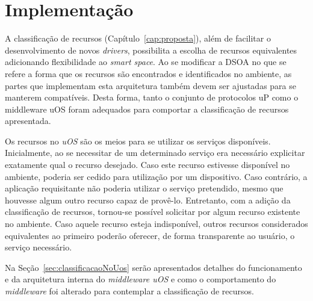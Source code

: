 \chapter{Implementação}

A classificação de recursos (Capítulo~\ref{cap:proposta}), além de facilitar o desenvolvimento de novos \emph{drivers}, possibilita a escolha de recursos equivalentes adicionando flexibilidade ao \emph{smart space}. Ao se modificar a DSOA no que se refere a forma que os recursos são encontrados e identificados no ambiente, as partes que implementam esta arquitetura também devem ser ajustadas para se manterem compatíveis. Desta forma, tanto o conjunto de protocolos uP como o middleware uOS foram adequados para comportar a classificação de recursos apresentada.

Os recursos no \emph{uOS} são os meios para se utilizar os serviços disponíveis. Inicialmente, ao se necessitar de um determinado serviço era necessário explicitar exatamente qual o recurso desejado. Caso este recurso estivesse disponível no ambiente, poderia ser cedido para utilização por um dispositivo. Caso contrário, a aplicação requisitante não poderia utilizar o serviço pretendido, mesmo que houvesse algum outro recurso capaz de provê-lo. Entretanto, com a adição da classificação de recursos, tornou-se possível solicitar por algum recurso existente no ambiente. Caso aquele recurso esteja indisponível, outros recursos considerados equivalentes ao primeiro poderão oferecer, de forma transparente ao usuário, o serviço necessário.

Na Seção~\ref{sec:classificacaoNoUos} serão apresentados detalhes do funcionamento e da arquitetura interna do \emph{middleware uOS} e como o comportamento do \emph{middleware} foi alterado para contemplar a classificação de recursos.


